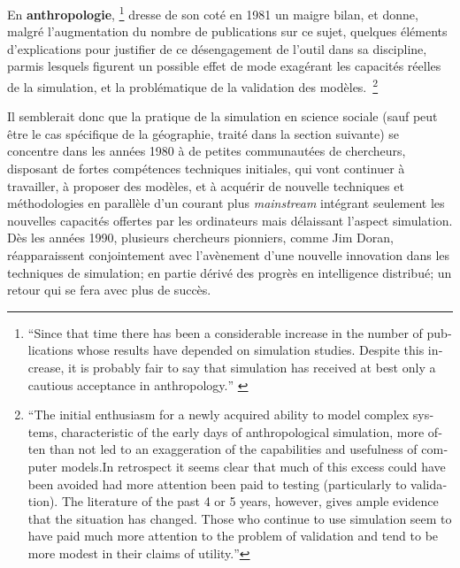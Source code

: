 {En \textbf{anthropologie}, \autocite{Dyke1981} \footnote{ \foreignquote{english}{Since that time there has been a considerable increase in the number of publications whose results have depended on simulation studies. Despite this increase, it is probably fair to say that simulation has received at best only a cautious acceptance in anthropology.} \autocite{Dyke1981} } dresse de son coté en 1981 un maigre bilan, et donne, malgré l'augmentation du nombre de publications sur ce sujet, quelques éléments d'explications pour justifier de ce désengagement de l'outil dans sa discipline, parmis lesquels figurent un possible effet de mode exagérant les capacités réelles de la simulation, et la problématique de la validation des modèles. \footnote{\foreignquote{english}{The initial enthusiasm for a newly acquired ability to model complex systems, characteristic of the early days of anthropological simulation, more often than not led to an exaggeration of the capabilities and usefulness of computer models.In retrospect it seems clear that much of this excess could have been avoided had more attention been paid to testing (particularly to validation). The literature of the past 4 or 5 years, however, gives ample evidence that the situation has changed. Those who continue to use simulation seem to have paid much more attention to the problem of validation and tend to be more modest in their claims of utility.}}

Il semblerait donc que la pratique de la simulation en science sociale (sauf peut être le cas spécifique de la géographie, traité dans la section suivante) se concentre dans les années 1980 à de petites communautées de chercheurs, disposant de fortes compétences techniques initiales, qui vont continuer à travailler, à proposer des modèles, et à acquérir de nouvelle techniques et méthodologies en parallèle d'un courant plus \textit{mainstream} intégrant seulement les nouvelles capacités offertes par les ordinateurs mais délaissant l'aspect simulation. 
Dès les années 1990, plusieurs chercheurs pionniers, comme Jim Doran, réapparaissent conjointement avec l’avènement d'une nouvelle innovation dans les techniques de simulation; en partie dérivé des progrès en intelligence distribué; un retour qui se fera avec plus de succès.

}
